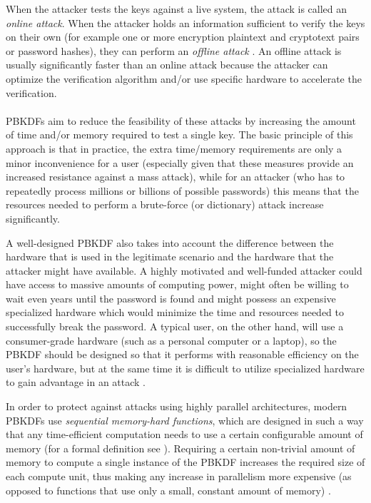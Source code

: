 \documentclass[12pt,oneside]{fithesis2}
\begin{document}
      When the attacker tests the keys against a live system, the attack is called an \emph{online attack}. When the attacker holds an information sufficient to verify the keys on their own (for example one or more encryption plaintext and cryptotext pairs or password hashes), they can perform an \emph{offline attack} \cite{appliedCrypto}. An offline attack is usually significantly faster than an online attack because the attacker can optimize the verification algorithm and/or use specific hardware to accelerate the verification.
      
      \paragraph*{}
      PBKDFs aim to reduce the feasibility of these attacks by increasing the amount of time and/or memory required to test a single key. The basic principle of this approach is that in practice, the extra time/memory requirements are only a minor inconvenience for a user (especially given that these measures provide an increased resistance against a mass attack), while for an attacker (who has to repeatedly process millions or billions of possible passwords) this means that the resources needed to perform a brute-force (or dictionary) attack increase significantly.
      
      A well-designed PBKDF also takes into account the difference between the hardware that is used in the legitimate scenario and the hardware that the attacker might have available. A highly motivated and well-funded attacker could have access to massive amounts of computing power, might often be willing to wait even years until the password is found and might possess an expensive specialized hardware which would minimize the time and resources needed to successfully break the password. A typical user, on the other hand, will use a consumer-grade hardware (such as a personal computer or a laptop), so the PBKDF should be designed so that it performs with reasonable efficiency on the user's hardware, but at the same time it is difficult to utilize specialized hardware to gain advantage in an attack \cite{openwall:pwHashing}.
      
      \label{p:memoryHard}
      In order to protect against attacks using highly parallel architectures, modern PBKDFs use \emph{sequential memory-hard functions}, which are designed in such a way that any time-efficient computation needs to use a certain configurable amount of memory (for a formal definition see \cite[chapter 4]{scrypt}). Requiring a certain non-trivial amount of memory to compute a single instance of the PBKDF increases the required size of each compute unit, thus making any increase in parallelism more expensive (as opposed to functions that use only a small, constant amount of memory) \cite{scrypt}.
      
\end{document}
